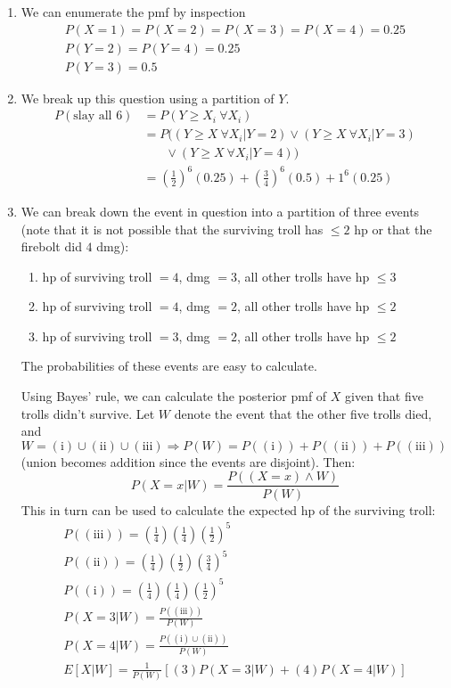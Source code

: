 \documentclass{article}
\begin{document}
\begin{enumerate}
\begin{enumerate}
			\item We can enumerate the pmf by inspection
			\begin{gather*}
				P(X=1)=P(X=2)=P(X=3)=P(X=4)=0.25\\
				P(Y=2)=P(Y=4)=0.25\\
				P(Y=3)=0.5
			\end{gather*}
			
			\item 
			We break up this question using a partition of $Y$.
			\begin{align*}
				P(\text{slay all 6})&=P(Y\ge X_i\ \forall X_i)\\
				&=P((Y\ge X\ \forall X_i|Y=2)\lor (Y\ge X\ \forall X_i|Y=3)\\
				&\ \ \ \ \ \ \ \ \lor (Y\ge X\ \forall X_i|Y=4))\\
				&=\left(\frac{1}{2}\right)^6(0.25)+\left(\frac{3}{4}\right)^6(0.5)+1^6(0.25)
			\end{align*}
			
			\clearpage
			\item
			We can break down the event in question into a partition of three events (note that it is not possible that the surviving troll has $\le 2$ hp or that the firebolt did $4$ dmg):
			\begin{enumerate}
				\item hp of surviving troll $=4$, dmg $=3$, all other trolls have hp $\le 3$
				\item hp of surviving troll $=4$, dmg $=2$, all other trolls have hp $\le 2$
				\item hp of surviving troll $=3$, dmg $=2$, all other trolls have hp $\le 2$
			\end{enumerate}
			The probabilities of these events are easy to calculate.
			
			Using Bayes' rule, we can calculate the posterior pmf of $X$ given that five trolls didn't survive. Let $W$ denote the event that the other five trolls died, and $W=(\text{i})\cup(\text{ii})\cup(\text{iii})\Rightarrow P(W)=P((\text{i}))+P((\text{ii}))+P((\text{iii}))$ (union becomes addition since the events are disjoint). Then:
			\begin{equation*}
				P(X=x|W)=\frac{P((X=x)\land W)}{P(W)}
			\end{equation*}
			This in turn can be used to calculate the expected hp of the surviving troll:
			\begin{gather*}
				P((\text{iii}))=\left(\frac{1}{4}\right)\left(\frac{1}{4}\right)\left(\frac{1}{2}\right)^5\\
				P((\text{ii}))=\left(\frac{1}{4}\right)\left(\frac{1}{2}\right)\left(\frac{3}{4}\right)^5\\
				P((\text{i}))=\left(\frac{1}{4}\right)\left(\frac{1}{4}\right)\left(\frac{1}{2}\right)^5\\
				P(X=3|W)=\frac{P((\text{iii}))}{P(W)}\\
				P(X=4|W)=\frac{P((\text{i})\cup(\text{ii}))}{P(W)}\\
				E[X|W]=\frac{1}{P(W)}\left[(3)P(X=3|W)+(4)P(X=4|W)\right]
			\end{gather*}
			

\end{enumerate}
\end{enumerate}
\end{document}
